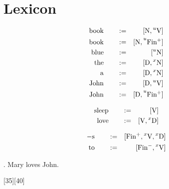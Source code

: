 \documentclass{article}
\begin{document}
\section{Lexicon}

\begin{glexicon}[nominal]
\begin{align}
\syndef{book}{[N,\un{V}]}\\
\syndef{book}{[N,\un{Fin^+}]}\\
\syndef{blue}{[\un{N}]}\\
\syndef{the}{[D,\ux{N}]}\\
\syndef{a}{[D,\ux{N}]}\\
\syndef{John}{[D,\un{V}]}\\
\syndef{John}{[D,\un{Fin^+}]}
\end{align}
\end{glexicon}


\begin{glexicon}[verbal]
\begin{align}
\syndef{sleep}{[V]}\\
\syndef{love}{[V,\ux{D}]}\\
\end{align}
\end{glexicon}

\begin{glexicon}[functional]
\begin{align}
				\syndef{-s}{[Fin^+,\ux{V},\ux{D}]}\\
	      \syndef{to}{[Fin^-,\ux{V}]}\\
\end{align}
\end{glexicon}


\ex. Mary loves John.

[35][40]
\end{document}

